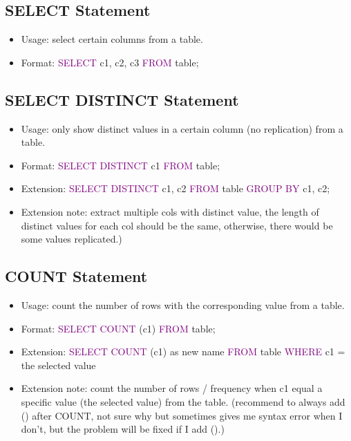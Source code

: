 \documentclass[a4paper]{article}
\begin{document}
\subsection{SELECT Statement}
\begin{itemize}
  \item Usage: select certain columns from a table.
  \item Format: \textcolor{purple}{SELECT} c1, c2, c3 \textcolor{purple}{FROM} table;
\end{itemize}

\subsection{SELECT DISTINCT Statement}
\begin{itemize}
  \item Usage: only show distinct values in a certain column (no replication) from a table.
  \item Format: \textcolor{purple}{SELECT DISTINCT} c1 \textcolor{purple}{FROM} table;
  \item Extension: \textcolor{purple}{SELECT DISTINCT} c1, c2 \textcolor{purple}{FROM} table \textcolor{purple}{GROUP BY} c1, c2;
  \item Extension note: extract multiple cols with distinct value, the length of distinct values for each col should be the same, otherwise, there would be some values replicated.)
\end{itemize}

\subsection{COUNT Statement}
\begin{itemize}
  \item Usage: count the number of rows with the corresponding value from a table.
  \item Format: \textcolor{purple}{SELECT COUNT} (c1) \textcolor{purple}{FROM} table;
  \item Extension: \textcolor{purple}{SELECT COUNT} (c1) as new name \textcolor{purple}{FROM} table \textcolor{purple}{WHERE} c1 = the selected value
  \item Extension note: count the number of rows / frequency when c1 equal a specific value (the selected value) from the table. (recommend to always add () after COUNT, not sure why but sometimes gives me syntax error when I don't, but the problem will be fixed if I add ().)
\end{itemize}
\end{document}
